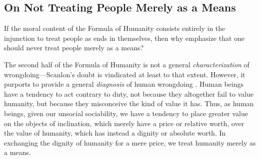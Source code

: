 \documentclass[12pt]{article}
\begin{document}

\subsection{On Not Treating People Merely as a Means} \label{sub:on_not_treating_people_merely_as_a_means} %

If the moral content of the Formula of Humanity consists entirely in the injunction to treat people as ends in themselves, then why emphasize that one should never treat people merely as a means? 

The second half of the Formula of Humanity is not a general \emph{characterization} of wrongdoing---Scanlon's doubt is vindicated at least to that extent. However, it purports to provide a general \emph{diagnosis} of human wrongdoing \citep[see][]{Wood:1999zy}. Human beings have a tendency to act contrary to duty, not because they altogether fail to value humanity, but because they misconceive the kind of value it has. Thus, as human beings, given our unsocial sociability, we have a tendency to place greater value on the objects of inclination, which merely have a price or relative worth, over the value of humanity, which has instead a dignity or absolute worth. In exchanging the dignity of humanity for a mere price, we treat humanity merely as a means.
\end{document}
